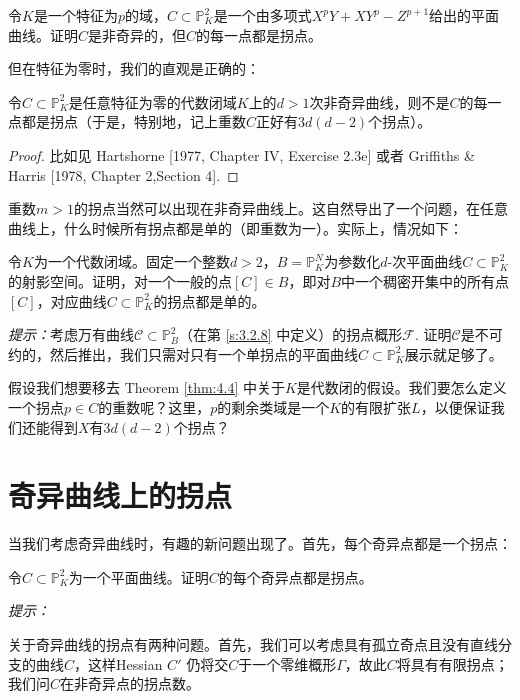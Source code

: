 
\begin{exe}\label{exe:4.3}
	令$K$是一个特征为$p$的域，$C\subset \mathbb P_K^2$是一个由多项式$X^p Y+XY^p-Z^{p+1}$给出的平面曲线。证明$C$是非奇异的，但$C$的每一点都是拐点。
\end{exe}

但在特征为零时，我们的直观是正确的：

\begin{thm}\label{thm:4.4}
	令$C\subset \mathbb P_K^2$是任意特征为零的代数闭域$K$上的$d>1$次非奇异曲线，则不是$C$的每一点都是拐点（于是，特别地，记上重数$C$正好有$3d(d-2)$个拐点）。
\end{thm}

\begin{proof}
	比如见 Hartshorne [1977, Chapter IV, Exercise 2.3e] 或者 Griffiths \& Harris [1978, Chapter 2,Section 4].
\end{proof}

重数$m>1$的拐点当然可以出现在非奇异曲线上。这自然导出了一个问题，在任意曲线上，什么时候所有拐点都是单的（即重数为一）。实际上，情况如下：

\begin{exe}\label{exe:4.5}
	令$K$为一个代数闭域。固定一个整数$d>2$，$B=\mathbb P_K^N$为参数化$d$-次平面曲线$C\subset \mathbb P_K^2$的射影空间。证明，对一个一般的点$[C]\in B$，即对$B$中一个稠密开集中的所有点$[C]$，对应曲线$C\subset \mathbb P_K^2$的拐点都是单的。

	\textit{提示：}考虑万有曲线$\mathscr C\subset \mathbb P_B^2$（在第 \ref{s:3.2.8} 中定义）的拐点概形$\mathscr F$. 证明$\mathscr C$是不可约的，然后推出，我们只需对只有一个单拐点的平面曲线$C\subset \mathbb P_K^2$展示就足够了。\nottran
\end{exe}

\begin{exe}\label{exe:4.6}
	假设我们想要移去 Theorem \ref{thm:4.4} 中关于$K$是代数闭的假设。我们要怎么定义一个拐点$p\in C$的重数呢？这里，$p$的剩余类域是一个$K$的有限扩张$L$，以便保证我们还能得到$X$有$3d(d-2)$个拐点？
\end{exe}

\section{奇异曲线上的拐点}\label{s:4.1.2}

当我们考虑奇异曲线时，有趣的新问题出现了。首先，每个奇异点都是一个拐点：
\begin{exe}\label{exe:4.7}
	令$C\subset \mathbb P_K^2$为一个平面曲线。证明$C$的每个奇异点都是拐点。

	\textit{提示：}\nottran
\end{exe}

\nottran



关于奇异曲线的拐点有两种问题。首先，我们可以考虑具有孤立奇点且没有直线分支的曲线$C$，这样Hessian $C'$ 仍将交$C$于一个零维概形$\Gamma$，故此$C$将具有有限拐点；我们问$C$在非奇异点的拐点数。

\nottran